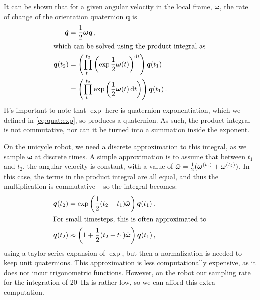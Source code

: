 \documentclass[main.tex]{subfiles}
\begin{document}
	It can be shown that for a given angular velocity in the local frame, $\bm{\omega}$, the rate of change of the orientation quaternion $\bm{q}$ is~\cite[p.~10]{boyle2016integration}
	\begin{align}
		\dot{\bm{q}} &= \frac{1}{2}\bm{\omega}\bm{q}\,, \\
	\intertext{which can be solved using the product integral as}
		\bm{q}(t_2)
			&= \left(\prod_{t_1}^{t_2} \left(\exp {\frac{1}{2}\bm{\omega}(t)}\right)^{\mathop{}\!\mathrm{d} t}\right) \bm{q}(t_1) \\
			&= \left(\prod_{t_1}^{t_2} \exp \left({\frac{1}{2}\bm{\omega}(t)} \mathop{}\!\mathrm{d} t\right)\right) \bm{q}(t_1)\,.
	\end{align}
	It's important to note that $\exp$ here is quaternion exponentiation, which we defined in \cref{eq:quat:exp}, so produces a quaternion.
	As such, the product integral is not commutative, nor can it be turned into a summation inside the exponent.

	On the unicycle robot, we need a discrete approximation to this integral, as we sample $\bm{\omega}$ at discrete times.
	A simple approximation is to assume that between $t_1$ and $t_2$, the angular velocity is constant, with a value of $\bar{\bm{\omega}} = \frac{1}{2}(\bm{\omega}^{(t_1)} + \bm{\omega}^{(t_2)})$.
	In this case, the terms in the product integral are all equal, and thus the multiplication is commutative -- so the integral becomes:
	\begin{align}
		\bm{q}(t_2)
			&= \exp \left(
				\frac{1}{2} (t_2 - t_1) \bar{\bm{\omega}}
			\right) \bm{q}(t_1)\,.
		\\
	\intertext{For small timesteps, this is often approximated to}
		\bm{q}(t_2)
			&\approx \left(1 + \frac{1}{2} (t_2 - t_1) \bar{\bm{\omega}}\right) \bm{q}(t_1)\,,
	\end{align}
	using a taylor series expansion of $\exp$, but then a normalization is needed to keep unit quaternions.
	This approximation is less computationally expensive, as it does not incur trigonometric functions.
	However, on the robot our sampling rate for the integration of \SI{20}{\hertz} is rather low, so we can afford this extra computation.

\bib
\end{document}
